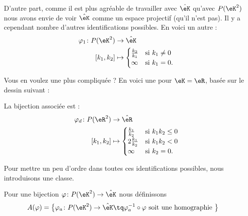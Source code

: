     D'autre part, comme il est plus agréable de travailler avec \( \hat\eK\) qu'avec \( P(\eK^2)\) nous avons envie de voir \( \hat\eK\) comme un espace projectif (qu'il n'est pas). Il y a cependant nombre d'autres identifications possibles. En voici un autre :
\begin{equation}
    \begin{aligned}
        \varphi_1\colon P(\eK^2)&\to \hat\eK \\
        [k_1,k_2]&\mapsto \begin{cases}
            \frac{ k_2 }{ k_1 }    &   \text{si  } k_1\neq 0\\
            \infty    &    \text{si } k_1=0.
        \end{cases}
    \end{aligned}
\end{equation}

Vous en voulez une plus compliquée ? En voici une pour \( \eK=\eR\), basée sur le dessin suivant :
\begin{center}
   
\end{center}

La bijection associée est :
\begin{equation}        \label{EQooMIGCooAtXPaS}
    \begin{aligned}
        \varphi_d\colon P(\eR^2)&\to \hat\eR \\
        [k_1,k_2]&\mapsto \begin{cases}
            \frac{ k_1 }{ k_2 }    &   \text{si } k_1k_2\leq 0\\
            2\frac{ k_1 }{ k_2 }    &    \text{si } k_1k_2<0\\
             \infty  &    \text{si } k_2=0.
        \end{cases}
    \end{aligned}
\end{equation}

Pour mettre un peu d'ordre dans toutes ces identifications possibles, nous introduisons une classe. 

\begin{definition}      \label{DEFooMLQUooGwvQMh}
    Pour une bijection \( \varphi\colon P(\eK^2)\to \hat\eK\) nous définissons
\begin{equation}
    \begin{aligned}[]
    A(\varphi)=\big\{  \varphi_a\colon P(\eK^2)&\to \hat\eK \tq \varphi_a^{-1}\circ\varphi
    \text{ soit une homographie } \big\}
    \end{aligned}
\end{equation}
\end{definition}

